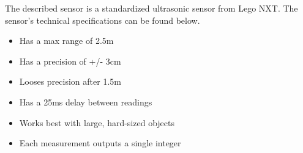 
The described sensor is a standardized ultrasonic sensor from Lego NXT. The
sensor's technical specifications\citep{Ultrasonic_sensor} can be found below.
\begin{itemize}
  \item Has a max range of 2.5m
  \item Has a precision of +/- 3cm
  \item Looses precision after 1.5m
  \item Has a 25ms delay between readings
  \item Works best with large, hard-sized objects
  \item Each measurement outputs a single integer
\end{itemize}

% 













